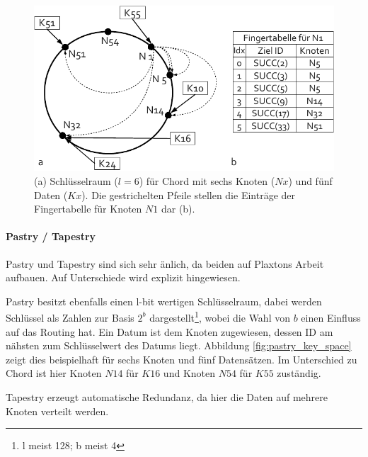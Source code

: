 \begin{figure}[htb]
\centering
\includegraphics{grafics/chord_key_space.pdf}
\caption{(a) Schlüsselraum ($l=6$) für Chord mit sechs Knoten ($Nx$) und fünf Daten ($Kx$). Die gestrichelten Pfeile stellen die Einträge der Fingertabelle für Knoten $N1$ dar (b).}
\label{fig:chord_key_space}
\end{figure}


\paragraph{Pastry / Tapestry}
Pastry \cite{Rowstron2001} und Tapestry \cite{Zhao2001Tapestry,Zhao2004Tapestry} sind sich sehr änlich, da beiden auf Plaxtons Arbeit \cite{Plaxton1997Accessing} aufbauen. Auf Unterschiede wird explizit hingewiesen.

Pastry besitzt ebenfalls einen l-bit wertigen Schlüsselraum, dabei werden Schlüssel als Zahlen zur Basis $2^b$ dargestellt\footnote{l meist 128; b meist 4}, wobei die Wahl von $b$ einen Einfluss auf das Routing hat. Ein Datum ist dem Knoten zugewiesen, dessen ID am nähsten zum Schlüsselwert des Datums liegt.  Abbildung \ref{fig:pastry_key_space} zeigt dies beispielhaft für sechs Knoten und fünf Datensätzen. Im Unterschied zu Chord ist hier Knoten $N14$ für $K16$ und Knoten $N54$ für $K55$ zuständig.\\

Tapestry erzeugt automatische Redundanz, da hier die Daten auf mehrere Knoten verteilt werden.


